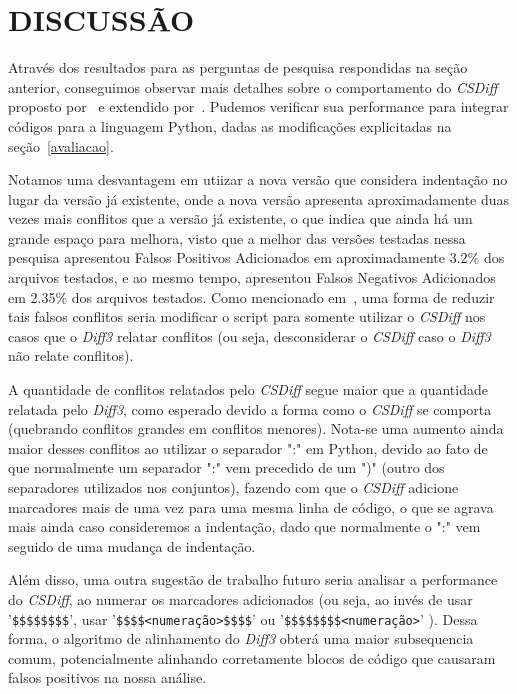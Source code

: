 \section{DISCUSSÃO}\label{discussao}
Através dos resultados para as perguntas de pesquisa respondidas na seção anterior, conseguimos observar mais detalhes sobre o
comportamento do \emph{CSDiff} proposto por~\cite{clem21} e extendido por~\cite{heitor21}. Pudemos verificar sua performance
para integrar códigos para a linguagem Python, dadas as modificações explicitadas na seção~\ref{avaliacao}.

Notamos uma desvantagem em utiizar a nova versão que considera indentação no lugar da versão já existente, onde a nova versão
apresenta aproximadamente duas vezes mais conflitos que a versão já existente, o que indica que ainda há um grande espaço para
melhora, visto que a melhor das versões testadas nessa pesquisa apresentou Falsos Positivos Adicionados em aproximadamente
3.2\% dos arquivos testados, e ao mesmo tempo, apresentou Falsos Negativos Adicionados em 2.35\% dos arquivos testados.
Como mencionado em~\cite{heitor21}, uma forma de reduzir tais falsos conflitos seria modificar o script para somente utilizar
o \emph{CSDiff} nos casos que o \emph{Diff3} relatar conflitos (ou seja, desconsiderar o \emph{CSDiff} caso o \emph{Diff3} não relate conflitos).

A quantidade de conflitos relatados pelo \emph{CSDiff} segue maior que a quantidade relatada pelo \emph{Diff3}, como esperado devido a
forma como o \emph{CSDiff} se comporta (quebrando conflitos grandes em conflitos menores). Nota-se uma aumento ainda maior desses conflitos
ao utilizar o separador ":" em Python, devido ao fato de que normalmente um separador ":" vem precedido de um ")" (outro
dos separadores utilizados nos conjuntos), fazendo com que o \emph{CSDiff} adicione marcadores mais de uma vez para uma mesma linha
de código, o que se agrava mais ainda caso consideremos a indentação, dado que normalmente o ":" vem seguido de uma mudança
de indentação.

Além disso, uma outra sugestão de trabalho futuro seria analisar a performance do \emph{CSDiff}, ao numerar os marcadores adicionados
(ou seja, ao invés de usar '\verb|$$$$$$$$|', usar '\verb|$$$$<numeração>$$$$|' ou '\verb|$$$$$$$$<numeração>|' ). Dessa forma, o
algoritmo de alinhamento do \emph{Diff3} obterá uma maior subsequencia comum, potencialmente alinhando corretamente blocos de código que
causaram falsos positivos na nossa análise.

